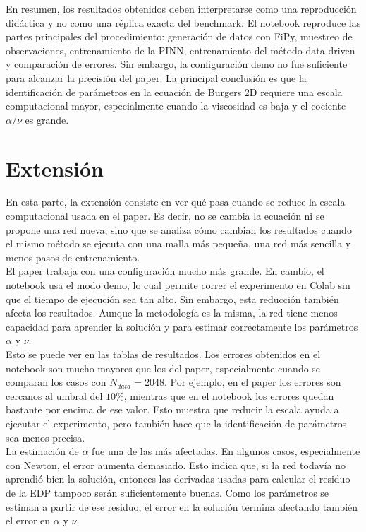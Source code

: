 \documentclass[10pt,letterpaper,twocolumn]{article}
\begin{document}
En resumen, los resultados obtenidos deben interpretarse como una reproducción didáctica y no como una réplica exacta del benchmark. El notebook reproduce las partes principales del procedimiento: generación de datos con FiPy, muestreo de observaciones, entrenamiento de la PINN, entrenamiento del método data-driven y comparación de errores. Sin embargo, la configuración demo no fue suficiente para alcanzar la precisión del paper. La principal conclusión es que la identificación de parámetros en la ecuación de Burgers 2D requiere una escala computacional mayor, especialmente cuando la viscosidad es baja y el cociente $\alpha/\nu$ es grande.
\section{Extensión}
En esta parte, la extensión consiste en ver qué pasa cuando se reduce la escala computacional usada en el paper. Es decir, no se cambia la ecuación ni se propone una red nueva, sino que se analiza cómo cambian los resultados cuando el mismo método se ejecuta con una malla más pequeña, una red más sencilla y menos pasos de entrenamiento.\\

El paper trabaja con una configuración mucho más grande. En cambio, el notebook usa el modo demo, lo cual permite correr el experimento en Colab sin que el tiempo de ejecución sea tan alto. Sin embargo, esta reducción también afecta los resultados. Aunque la metodología es la misma, la red tiene menos capacidad para aprender la solución y para estimar correctamente los parámetros $\alpha$ y $\nu$.\\

Esto se puede ver en las tablas de resultados. Los errores obtenidos en el notebook son mucho mayores que los del paper, especialmente cuando se comparan los casos con $N_{data}=2048$. Por ejemplo, en el paper los errores son cercanos al umbral del $10\%$, mientras que en el notebook los errores quedan bastante por encima de ese valor. Esto muestra que reducir la escala ayuda a ejecutar el experimento, pero también hace que la identificación de parámetros sea menos precisa.\\

La estimación de $\alpha$ fue una de las más afectadas. En algunos casos, especialmente con Newton, el error aumenta demasiado. Esto indica que, si la red todavía no aprendió bien la solución, entonces las derivadas usadas para calcular el residuo de la EDP tampoco serán suficientemente buenas. Como los parámetros se estiman a partir de ese residuo, el error en la solución termina afectando también el error en $\alpha$ y $\nu$.\\
\end{document}
